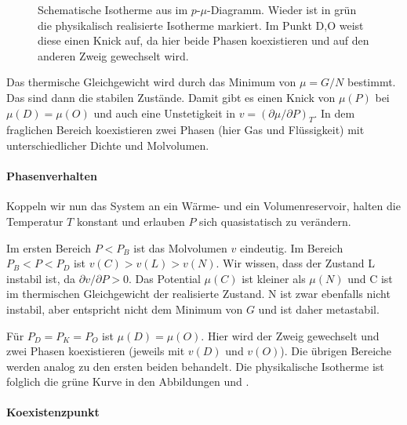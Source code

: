 \begin{figure}[htbp]
    \centering
    \tfigPhaseSeparationChemPotential
    \caption{Schematische Isotherme aus  im $p$-$\mu$-Diagramm. Wieder ist in grün die physikalisch realisierte Isotherme markiert. Im Punkt D,O weist diese einen Knick auf, da hier beide Phasen koexistieren und auf den anderen Zweig gewechselt wird. }
    \label{fig:PhaseSeparationChemPotential}
\end{figure}

Das thermische Gleichgewicht wird durch das Minimum von $\mu=G/N$ bestimmt. Das sind dann die stabilen Zustände.  Damit gibt es einen Knick von $\mu(P)$ bei $\mu(D)=\mu(O)$ und auch eine Unstetigkeit in $v=(\partial\mu/\partial P)_T$. In dem fraglichen Bereich koexistieren zwei Phasen (hier Gas und Flüssigkeit) mit unterschiedlicher Dichte und Molvolumen.


\paragraph*{Phasenverhalten}

Koppeln wir nun das System an ein Wärme- und ein Volumenreservoir, halten die Temperatur $T$ konstant und erlauben $P$ sich quasistatisch zu verändern.

Im ersten Bereich $P<P_B$ ist das Molvolumen $v$ eindeutig. Im Bereich $P_B<P<P_D$ ist $v(C)>v(L)>v(N)$. Wir wissen, dass der Zustand L instabil ist, da $\partial v/\partial P>0$. Das Potential $\mu(C)$ ist kleiner als $\mu(N)$ und C ist im thermischen Gleichgewicht der realisierte Zustand. N ist zwar ebenfalls nicht instabil, aber entspricht nicht dem Minimum von $G$ und ist daher metastabil.

Für $P_D=P_K=P_O$ ist $\mu(D) = \mu(O)$. Hier wird der Zweig gewechselt und zwei Phasen koexistieren (jeweils mit $v(D)$ und $v(O)$). Die übrigen Bereiche werden analog zu den ersten beiden behandelt. Die physikalische Isotherme ist folglich die grüne Kurve in den Abbildungen  und .


\paragraph*{Koexistenzpunkt}

